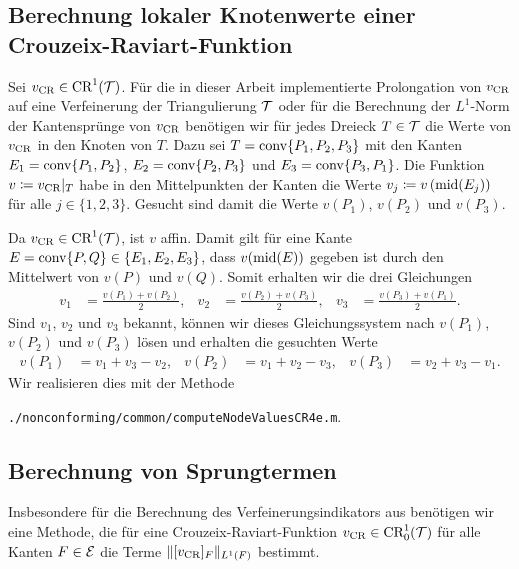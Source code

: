 \subsection{Berechnung lokaler Knotenwerte einer Crouzeix-Raviart-Funktion}

Sei $v_\textup{CR}\in\textup{CR}^1(\mathcal{T})$.
Für die in dieser Arbeit implementierte Prolongation von $v_\textup{CR}$ auf eine
Verfeinerung der Triangulierung $\mathcal{T}$ oder für die Berechnung der $L^1$-Norm
der Kantensprünge von $v_\textup{CR}$ benötigen wir für jedes Dreieck $T\in\mathcal{T}$ die
Werte von $v_\textup{CR}$ in den Knoten von $T$. 
Dazu sei $T = \textup{conv}\{P_1, P_2, P_3\}$ mit den Kanten
$E_1 = \textup{conv}\{P_1,P_2\}$, $E_2 = \textup{conv}\{P_2,P_3\}$ und $E_3 =
\textup{conv}\{P_3,P_1\}$. 
Die Funktion $v\coloneqq v_\textup{CR}|_T$ habe in den Mittelpunkten der Kanten die Werte
$v_j\coloneqq v\left(\textup{mid}(E_j)\right)$ für alle $j\in\{1,2,3\}$. 
Gesucht sind damit die Werte $v(P_1)$, $v(P_2)$ und $v(P_3)$.

Da $v_\textup{CR}\in\textup{CR}^1(\mathcal{T})$, ist $v$ affin. Damit gilt für eine Kante
$E=\textup{conv}\{P,Q\}\in\{E_1,E_2,E_3\}$, dass $v(\textup{mid}(E))$ gegeben ist durch den
Mittelwert von $v(P)$ und $v(Q)$.
Somit erhalten wir die drei Gleichungen
\begin{align*}
  v_1 &= \frac{v(P_1)+v(P_2)}{2},  
  &v_2 &= \frac{v(P_2)+v(P_3)}{2},  
  &v_3 &= \frac{v(P_3)+v(P_1)}{2}.
\end{align*}
Sind $v_1$, $v_2$ und $v_3$ bekannt, können wir dieses Gleichungssystem nach 
$v(P_1)$, $v(P_2)$ und $v(P_3)$ lösen und erhalten die gesuchten Werte
\begin{align*}
 v(P_1)&=v_1+v_3-v_2, &v(P_2)&= v_1+v_2-v_3,&v(P_3)&=v_2+v_3-v_1.
\end{align*}
Wir realisieren dies mit der Methode
\begin{center}
  \texttt{./nonconforming/common/computeNodeValuesCR4e.m}.
\end{center} 

\subsection{Berechnung von Sprungtermen}

Insbesondere für die Berechnung des Verfeinerungsindikators aus
 benötigen wir eine Methode, die
für eine Crouzeix-Raviart-Funktion
$v_\textup{CR}\in\textup{CR}^1_0(\mathcal{T})$
für alle Kanten $F\in\mathcal{E}$ die Terme $\Vert [v_\textup{CR}]_F\Vert_{L^1(F)}$ 
bestimmt.

